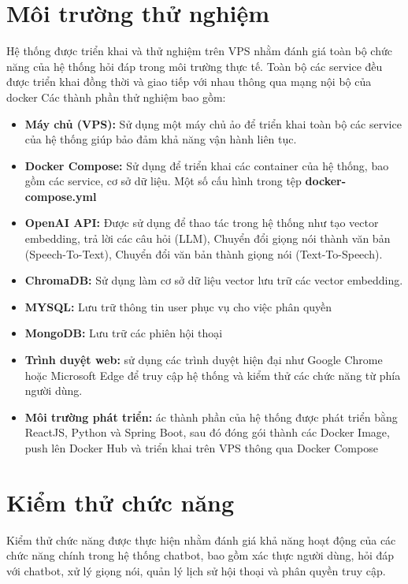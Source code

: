 \documentclass[../DoAn.tex]{subfiles}
\begin{document}
\section{Môi trường thử nghiệm}
Hệ thống được triển khai và thử nghiệm trên VPS nhằm đánh giá toàn bộ chức năng của hệ thống hỏi đáp trong môi trường thực tế.
Toàn bộ các service đều được triển khai đồng thời và giao tiếp với nhau thông qua mạng nội bộ của docker
Các thành phần thử nghiệm bao gồm:
\begin{itemize}
    \item \textbf{Máy chủ (VPS):} Sử dụng một máy chủ ảo để triển khai toàn bộ các service của hệ thống giúp bảo đảm khả năng vận hành liên tục.
    \item \textbf{Docker Compose:} Sử dụng để triển khai các container của hệ thống, bao gồm các service, cơ sở dữ liệu. Một số cấu hình trong tệp \textbf{docker-compose.yml}
    \item \textbf{OpenAI API:} Được sử dụng để thao tác trong hệ thống như tạo vector embedding, trả lời các câu hỏi (LLM), Chuyển đổi giọng nói thành văn bản (Speech-To-Text), Chuyển đổi văn bản thành giọng nói (Text-To-Speech).
    \item \textbf{ChromaDB:} Sử dụng làm cơ sở dữ liệu vector lưu trữ các vector embedding.
    \item \textbf{MYSQL:} Lưu trữ thông tin user phục vụ cho việc phân quyền
    \item \textbf{MongoDB:} Lưu trữ các phiên hội thoại
    \item \textbf{Trình duyệt web:} sử dụng các trình duyệt hiện đại như Google Chrome hoặc Microsoft Edge để truy cập hệ thống và kiểm thử các chức năng từ phía người dùng.
    \item \textbf{Môi trường phát triển:} ác thành phần của hệ thống được phát triển bằng ReactJS, Python và Spring Boot, sau đó đóng gói thành các Docker Image, push lên Docker Hub và triển khai trên VPS thông qua Docker Compose
\end{itemize}

\section{Kiểm thử chức năng}
Kiểm thử chức năng được thực hiện nhằm đánh giá khả năng hoạt động của các chức năng chính trong hệ thống chatbot, bao gồm xác thực người dùng, hỏi đáp với chatbot, xử lý giọng nói, quản lý lịch sử hội thoại và phân quyền truy cập.
\end{document}
